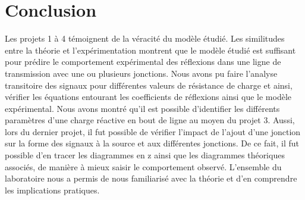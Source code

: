 \section{Conclusion}

Les projets 1 à 4 témoignent de la véracité du modèle étudié. Les similitudes entre la théorie et l'expérimentation montrent que le modèle étudié est suffisant pour prédire le comportement expérimental des réflexions dans une ligne de transmission avec une ou plusieurs jonctions. Nous avons pu faire l'analyse transitoire des signaux pour différentes valeurs de résistance de charge et ainsi, vérifier les équations entourant les coefficients de réflexions ainsi que le modèle expérimental.  Nous avons montré qu'il est possible d'identifier les différents paramètres d'une charge réactive en bout de ligne au moyen du projet 3. Aussi, lors du dernier projet, il fut possible de vérifier l'impact de l'ajout d'une jonction sur la forme des signaux à la source et aux différentes jonctions. De ce fait, il fut possible d'en tracer les diagrammes en z ainsi que les diagrammes théoriques associés, de manière à mieux saisir le comportement observé. L'ensemble du laboratoire nous a permis de nous familiarisé avec la théorie et d'en comprendre les implications pratiques. 